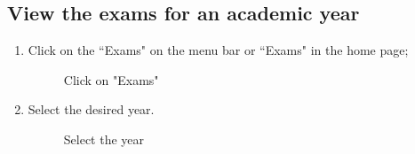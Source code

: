 \documentclass[ManualeUtente]{subfiles}
\begin{document}
\subsection{View the exams for an academic year}
\begin{enumerate}
	\item Click on the \textquotedblleft Exams" on the menu bar or \textquotedblleft Exams" in the home page;
	\begin{figure}[H]
		\centering
		\caption{Click on "Exams"}
		\label{fig:Click on "Exams"}
	\end{figure}
	\item Select the desired year.
	\begin{figure}[H]
		\centering
		\caption{Select the year}
		\label{fig:Select the year}
	\end{figure}
\end{enumerate}
\end{document}
